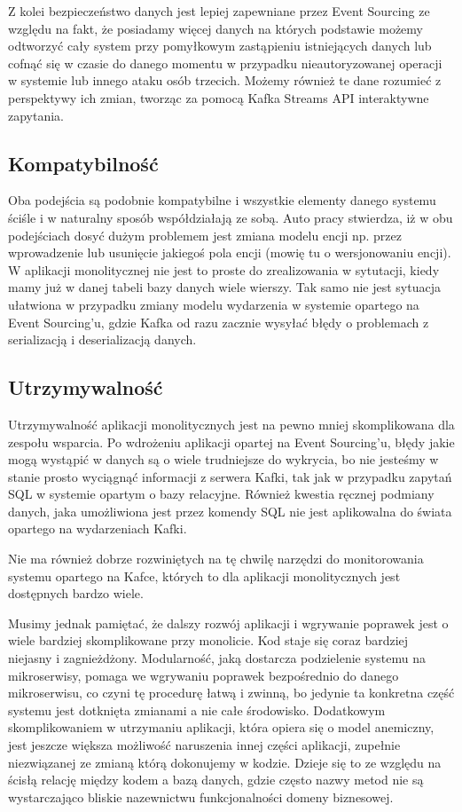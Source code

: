 Z kolei bezpieczeństwo danych jest lepiej zapewniane przez Event Sourcing ze względu na fakt, że posiadamy więcej danych na których podstawie możemy odtworzyć cały system przy pomyłkowym zastąpieniu istniejących danych lub cofnąć się w czasie do danego momentu w przypadku nieautoryzowanej operacji w systemie lub innego ataku osób trzecich. Możemy również te dane rozumieć z perspektywy ich zmian, tworząc za pomocą Kafka Streams API interaktywne zapytania.

\subsection{Kompatybilność}
Oba podejścia są podobnie kompatybilne i wszystkie elementy danego systemu ściśle i w naturalny sposób współdziałają ze sobą. 
Auto pracy stwierdza, iż w obu podejściach dosyć dużym problemem jest zmiana modelu encji np. przez wprowadzenie lub usunięcie jakiegoś pola encji (mowię tu o wersjonowaniu encji). W aplikacji monolitycznej nie jest to proste do zrealizowania w sytutacji, kiedy mamy już w danej tabeli bazy danych wiele wierszy. Tak samo nie jest sytuacja ułatwiona w przypadku zmiany modelu wydarzenia w systemie opartego na Event Sourcing'u, gdzie Kafka od razu zacznie wysyłać błędy o problemach z serializacją i deserializacją danych.

\subsection{Utrzymywalność}
Utrzymywalność aplikacji monolitycznych jest na pewno mniej skomplikowana dla zespołu wsparcia. Po wdrożeniu aplikacji opartej na Event Sourcing'u, błędy jakie mogą wystąpić w danych są o wiele trudniejsze do wykrycia, bo nie jesteśmy w stanie prosto wyciągnąć informacji z serwera Kafki, tak jak w przypadku zapytań SQL w systemie opartym o bazy relacyjne. Również kwestia ręcznej podmiany danych, jaka umożliwiona jest przez komendy SQL nie jest aplikowalna do świata opartego na wydarzeniach Kafki.

Nie ma również dobrze rozwiniętych na tę chwilę narzędzi do monitorowania systemu opartego na Kafce, których to dla aplikacji monolitycznych jest dostępnych bardzo wiele. 

Musimy jednak pamiętać, że dalszy rozwój aplikacji i wgrywanie poprawek jest o wiele bardziej skomplikowane przy monolicie.  Kod staje się coraz bardziej niejasny i zagnieżdżony. Modularność, jaką dostarcza podzielenie systemu na mikroserwisy, pomaga we wgrywaniu poprawek bezpośrednio do danego mikroserwisu, co czyni tę procedurę łatwą i zwinną, bo jedynie ta konkretna część systemu jest dotknięta zmianami a nie całe środowisko. Dodatkowym skomplikowaniem w utrzymaniu aplikacji, która opiera się o model anemiczny, jest jeszcze większa możliwość naruszenia innej części aplikacji, zupełnie niezwiązanej ze zmianą którą dokonujemy w kodzie. Dzieje się to ze względu na ścisłą relację między kodem a bazą danych, gdzie często nazwy metod nie są wystarczająco bliskie nazewnictwu funkcjonalności domeny biznesowej.


